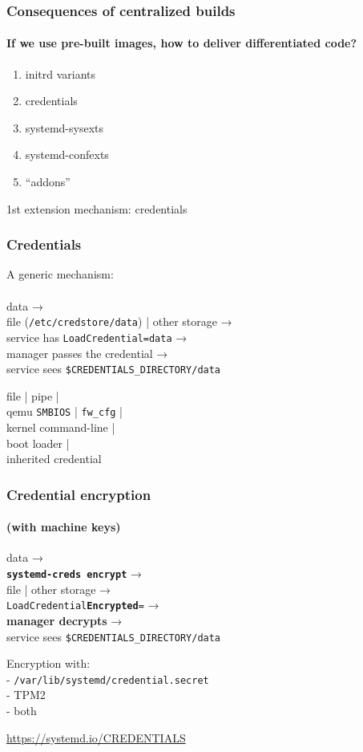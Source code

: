 \documentclass[]{beamer}
\newcommand\pp{}
\begin{document}
\begin{frame}
  \frametitle{Consequences of centralized builds}
  \framesubtitle{If we use pre-built images, how to deliver differentiated code?}
  \pp

  \begin{enumerate}
  \item initrd variants\pp
  \item credentials\pp
  \item systemd-sysexts\pp
  \item systemd-confexts\pp
  \item ``addons''
  \end{enumerate}


\end{frame}

\begin{frame}
  1st extension mechanism: credentials
\end{frame}

\begin{frame}
  \frametitle{Credentials}
  \pp

  A generic mechanism:\\\\
  data → \\
  file (\texttt{/etc/credstore/data}) | other storage → \\
  service has \texttt{LoadCredential=data} → \\
  manager passes the credential → \\
  service sees \texttt{\$CREDENTIALS\_DIRECTORY/data}

  \pp
  \quad

  file | pipe | \\
  qemu \texttt{SMBIOS} | \texttt{fw\_cfg} | \\
  kernel command-line | \\
  boot loader | \\
  inherited credential
\end{frame}

\begin{frame}[fragile]
  \frametitle{Credential encryption}
  \framesubtitle{(with machine keys)}

  \pp
  data → \\
  \textbf{\texttt{systemd-creds encrypt}} → \\
  file | other storage → \\
  \texttt{LoadCredential\textbf{Encrypted}=} → \\
  \textbf{manager decrypts} → \\
  service sees \texttt{\$CREDENTIALS\_DIRECTORY/data}

  \pp
  \quad

  Encryption with:\\
  - \texttt{/var/lib/systemd/credential.secret}
  \\
  - TPM2
  \\
  - both

  \vfill

  \small
  \url{https://systemd.io/CREDENTIALS}
\end{frame}
\end{document}
